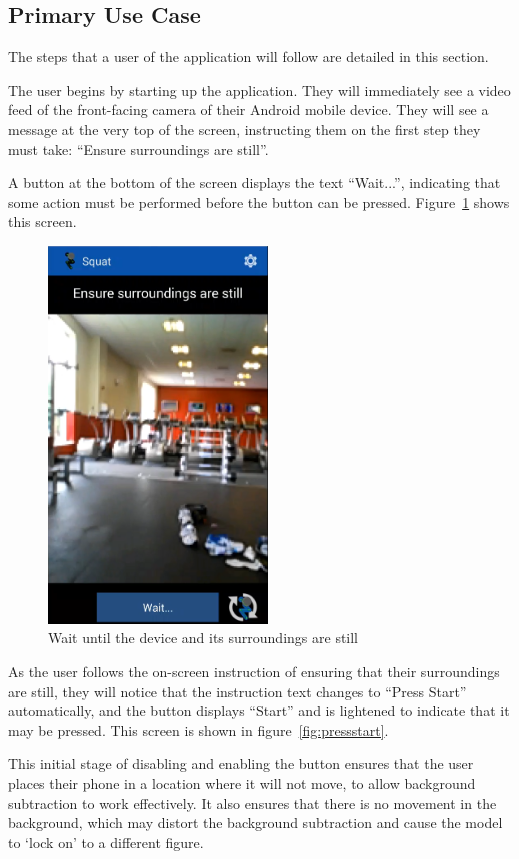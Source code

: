 \subsection{Primary Use Case}

The steps that a user of the application will follow are detailed in this section.

The user begins by starting up the application. They will immediately see a video feed of the front-facing camera of their Android mobile device. They will see a message at the very top of the screen, instructing them on the first step they must take: ``Ensure surroundings are still''.

A button at the bottom of the screen displays the text ``Wait...'', indicating that some action must be performed before the button can be pressed. Figure~\ref{fig:ensuresurroundings} shows this screen.

\begin{figure}[H]
    \centering
	\includegraphics[height=10cm]{application/images/ensuresurroundingsstill}
\caption{Wait until the device and its surroundings are still}
\label{fig:ensuresurroundings}
\end{figure}

As the user follows the on-screen instruction of ensuring that their surroundings are still, they will notice that the instruction text changes to ``Press Start'' automatically, and the button displays ``Start'' and is lightened to indicate that it may be pressed. This screen is shown in figure~\ref{fig:pressstart}.

This initial stage of disabling and enabling the button ensures that the user places their phone in a location where it will not move, to allow background subtraction to work effectively. It also ensures that there is no movement in the background, which may distort the background subtraction and cause the model to `lock on' to a different figure.

